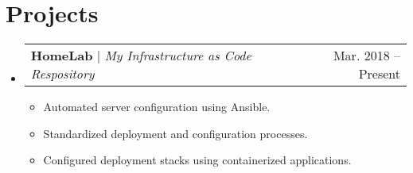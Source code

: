 \documentclass[letterpaper,11pt]{article}
\makeatletter
\newcommand{\resumeItem}[1]{\item\small{{#1 \vspace{-2pt}}}}
\newcommand{\blogLinkItem}[3]{\item{\begin{tabular*}{0.95\textwidth}[t]{l@{\extracolsep{\fill}}r}\href{#2}{\small{\textit{``#1``}} \small{\faLink}} & \small{#3}\end{tabular*}\vspace{-2pt}}}
\newcommand{\blogLinkList}[1]{\begin{itemize}[leftmargin=0.15in]#1\end{itemize}\vspace{-5pt}}
\newcommand{\resumeSection}[2]{\section{#1}\begin{itemize}[leftmargin=0.15in, label={}]#2\end{itemize}}
\newcommand{\resumeProjectHeading}[2]{\item{\begin{tabular*}{0.97\textwidth}{l@{\extracolsep{\fill}}r}\small#1 & #2 \\ \end{tabular*}\vspace{-7pt}}}
\newcommand{\resumeItemList}[1]{\begin{itemize}#1\end{itemize}\vspace{-5pt}}
\makeatother
\begin{document}
\resumeSection{Projects}{

	\resumeProjectHeading{\textbf{HomeLab} $|$ \emph{My Infrastructure as Code Respository}}{Mar. 2018 -- Present}
	\resumeItemList{
		\resumeItem{Automated server configuration using Ansible.}
		\resumeItem{Standardized deployment and configuration processes.}
		\resumeItem{Configured deployment stacks using containerized applications.}
	}
}
\end{document}
